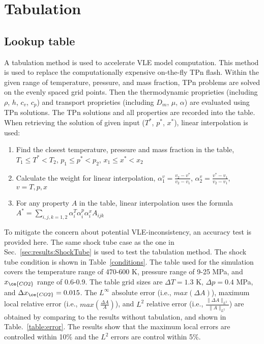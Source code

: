 \chapter{Tabulation}
\label{tabulation_chapter}

\section{Lookup table} \label{App:tab} %
    
    A tabulation method is used to accelerate VLE model computation. This method is used to replace the computationally expensive on-the-fly TPn flash. Within the given range of temperature, pressure, and mass fraction, TPn problems are solved on the evenly spaced grid points. Then the thermodynamic proprieties (including $\rho$, $h$, $c_v$, $c_p$) and  transport  proprieties (including $D_m$, $\mu$, $\alpha$) are evaluated using TPn solutions. 
    The TPn solutions and all properties are recorded into the table. When retrieving the solution of given input ($T^*$, $p^*$, $x^*$), linear interpolation is used:
    \begin{enumerate}
     \item Find the closest temperature, pressure and mass fraction in the table, 
     $T_1 \leq T^* < T_2 $,
     $p_1 \leq p^* < p_2 $,
     $x_1 \leq x^* < x_2 $
     \item Calculate the weight for linear interpolation,
     $ \alpha^v_1=\frac{v_2-v^*}{v_2-v_1}$,
     $ \alpha^v_2=\frac{v^*-v_1}{v_2-v_1}$, $v=T,p,x$
     \item For any property $A$ in the table, linear interpolation uses the formula $A^* = \sum_{i,j,k=1,2}\alpha^T_i \alpha^p_i \alpha^x_i A_{ijk} $
    \end{enumerate}
    
    To mitigate the concern about potential VLE-inconsistency, an accuracy test is provided here. The same shock tube case as the one in Sec.~\ref{sec:results:ShockTube} is used to test the tabulation method. The shock tube condition is shown in Table~\ref{conditions}.
    The table used for the simulation covers the temperature range of 470-600 K, pressure range of 9-25 MPa, and $x_{\ce{CO2}}$ range of 0.6-0.9. The table grid sizes are $\Delta T = 1.3$ K, $\Delta p = 0.4$ MPa, and $\Delta x_{\ce{CO2}} = 0.015$.
    The $L^{\infty}$ absolute error (i.e., $max(\Delta A)$), maximum local relative error (i.e., $max(\frac{\Delta A}{A})$), and $L^2$ relative error (i.e., $ \frac{\|\Delta A\|_{L^2}}{\|A\|_{L^2}}$) are obtained by comparing to the results without tabulation, and shown in Table.~\ref{table:error}. The results show that the maximum local errors are controlled within 10\% and the $L^2$ errors are control within 5\%.

